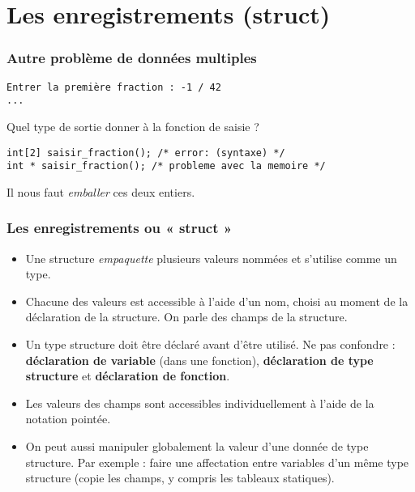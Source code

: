 \documentclass[xcolor=pdftex,svgnames,table]{beamer}
\begin{document}
\section{Les enregistrements (struct)}

\begin{frame}[fragile]
  \frametitle{Autre problème de données multiples}
\begin{verbatim}
Entrer la première fraction : -1 / 42
...
\end{verbatim}
\pause
Quel type de sortie donner à la fonction de saisie ?
  \begin{lstlisting}
int[2] saisir_fraction(); /* error: (syntaxe) */
int * saisir_fraction(); /* probleme avec la memoire */
  \end{lstlisting}

Il nous faut \emph{emballer} ces deux entiers.
\end{frame}

\begin{frame}
  \frametitle{Les enregistrements ou  « struct »}
\begin{itemize}
\item Une structure \emph{empaquette} plusieurs valeurs nommées et s'utilise comme un \alert{type}. \pause
\item Chacune des valeurs est accessible à l'aide d'un nom, choisi au
  moment de  la  déclaration de la structure. On parle des \alert{champs} de la
  structure.\pause
\item Un type structure doit être déclaré avant d'être
  utilisé. Ne pas confondre : \textbf{déclaration de variable} (dans une
  fonction), \textbf{déclaration de type structure} et  \textbf{déclaration de fonction}.
\pause
\item Les valeurs des champs sont accessibles individuellement à l'aide de la
  \alert{notation pointée}. \pause
\item On peut aussi manipuler globalement la valeur d'une donnée de
  type structure. Par exemple : faire une affectation entre variables
  d'un même type structure (copie les champs, y compris les tableaux statiques).
\end{itemize}
\end{frame}
\end{document}
